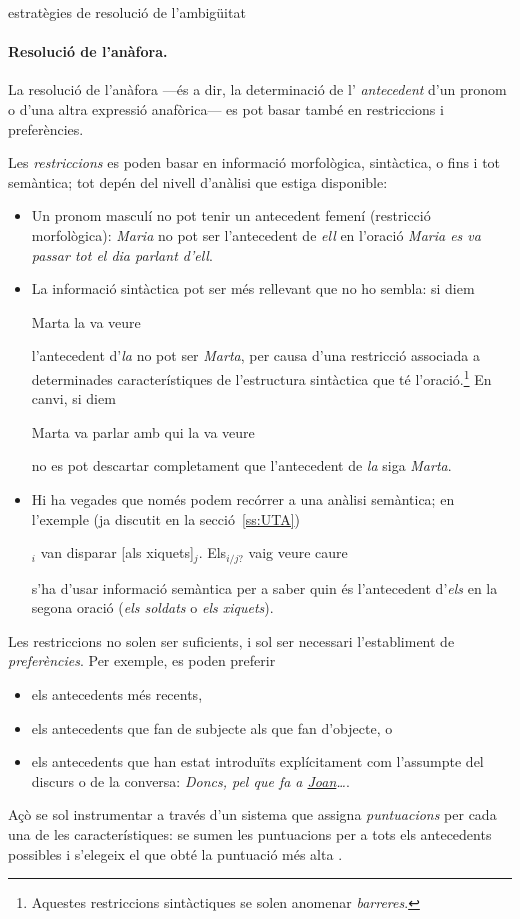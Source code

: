 \begin{persabermes}{estratègies de resolució de l'ambigüitat}
  \paragraph{Resolució de l'anàfora.}
  La resolució de l'anàfora ---és a dir, la determinació de l'{\em
    antecedent} d'un pronom o d'una altra expressió anafòrica--- es
  pot basar també en restriccions i preferències.

  Les \emph{restriccions} es poden basar en informació morfològica,
  sintàctica, o fins i tot semàntica; tot depén del nivell d'anàlisi
  que estiga disponible:
  \begin{itemize}
  \item Un pronom masculí no pot tenir un antecedent femení
    (restricció morfològica): \emph{Maria} no pot ser l'antecedent de
    \emph{ell} en l'oració \emph{Maria es va passar tot el dia parlant
      d'ell}.
  \item La informació sintàctica pot ser més rellevant que no ho
    sembla: si diem
    \begin{exemple}
      Marta la va veure
    \end{exemple} 
    l'antecedent d'\emph{la} no pot ser \emph{Marta}, per causa d'una
    restricció associada a determinades característiques de
    l'estructura sintàctica que té l'oració.\footnote{Aquestes
      restriccions sintàctiques se solen anomenar \emph{barreres}.}
    En canvi, si diem
    \begin{exemple}
      Marta va parlar amb qui la va veure
    \end{exemple} 
    no es pot descartar completament que l'antecedent de \emph{la}
    siga \emph{Marta}.
  \item Hi ha vegades que només podem recórrer a una anàlisi
    semàntica; en l'exemple (ja discutit en la secció~\ref{ss:UTA})
    \begin{exemple} 
      $_i$ van disparar [als xiquets]$_j$. Els$_{i/j?}$
      vaig veure caure
    \end{exemple}
    s'ha d'usar informació semàntica per a saber quin és l'antecedent
    d'\emph{els} en la segona oració (\emph{els soldats} o \emph{els
      xiquets}).
  \end{itemize}

  Les restriccions no solen ser suficients, i sol ser necessari
  l'establiment de \emph{preferències}. Per exemple, es poden preferir
  \begin{itemize}
  \item els antecedents més recents,
  \item els antecedents que fan de subjecte als que fan d'objecte, o
  \item els antecedents que han estat introduïts explícitament com
    l'assumpte del discurs o de la conversa: \emph{Doncs, pel que fa a
      \underline{Joan}\ldots}.
  \end{itemize}
  Açò se sol instrumentar a través d'un sistema que assigna
  \emph{puntuacions} per cada una de les característiques: se sumen
  les puntuacions per a tots els antecedents possibles i s'elegeix el
  que obté la puntuació més alta \citep{lappin94j}.


\end{persabermes}
